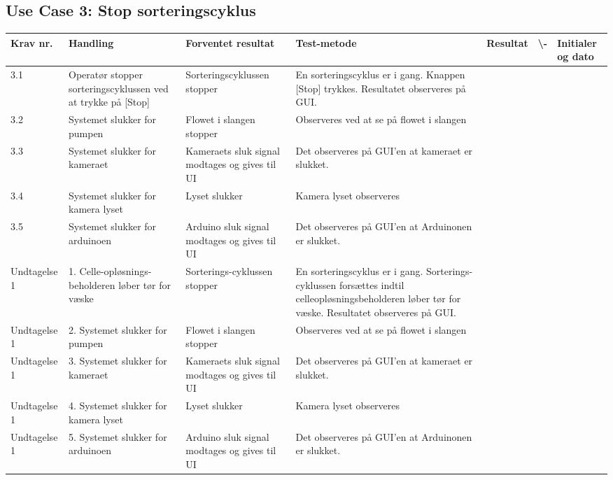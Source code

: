   \subsection{Use Case 3: Stop sorteringscyklus}
\begin{center}
		\begin{longtable}{ | m{1.785cm} | m{1.785cm}| m{1.785cm}| m{1.785cm}| m{1.785cm}| m{1.785cm}|m{1.785cm}| } 
			\hline
			\textbf{Krav nr.} &\textbf{ Handling} & \textbf{Forventet resultat} & \textbf{Test-metode} &\textbf{Resultat} & \textbf{ \checkmark \textbackslash -} & \textbf{Initialer og dato} \\ 
			
			\hline
			3.1 &  Operatør stopper sorteringscyklussen ved at trykke på [Stop] & Sorteringscyklussen stopper & En sorteringscyklus er i gang. Knappen [Stop] trykkes. Resultatet observeres på GUI.  &  & & \\
			\hline
			
			\hline
			3.2 &  Systemet slukker for pumpen & Flowet i slangen stopper & Observeres ved at se på flowet i slangen &  & & \\
			\hline
			
			3.3 &  Systemet slukker for kameraet  & Kameraets sluk signal modtages og gives til UI & Det observeres på GUI’en at kameraet er slukket.  &  & & \\
			\hline
			
			3.4 &  Systemet slukker for kamera lyset  & Lyset slukker & Kamera lyset observeres  &  & & \\
			\hline
			
			3.5 &  Systemet slukker for arduinoen & Arduino sluk signal modtages og gives til UI & Det observeres på GUI’en at Arduinonen er slukket. &  & & \\
			\hline
			
			Undtagelse 1 &  1. Celle-opløsnings-beholderen løber tør for væske & Sorterings-cyklussen stopper & En sorteringscyklus er i gang. Sorterings-cyklussen forsættes indtil celleopløsningsbeholderen løber tør for væske. Resultatet observeres på GUI.  & & \\
			\hline
			
	
			Undtagelse 1 &  2. Systemet slukker for pumpen & Flowet i slangen stopper & Observeres ved at se på flowet i slangen &  & & \\
			\hline
			
			Undtagelse 1 &  3. Systemet slukker for kameraet  & Kameraets sluk signal modtages og gives til UI & Det observeres på GUI’en at kameraet er slukket.  &  & & \\
			\hline
			
			Undtagelse 1 &  4. Systemet slukker for kamera lyset  & Lyset slukker & Kamera lyset observeres  &  & & \\
			\hline
			
			Undtagelse 1 &  5. Systemet slukker for arduinoen & Arduino sluk signal modtages og gives til UI & Det observeres på GUI’en at Arduinonen er slukket. &  & & \\
			\hline			
			
		\end{longtable}
		
	\end{center}
	\pagebreak